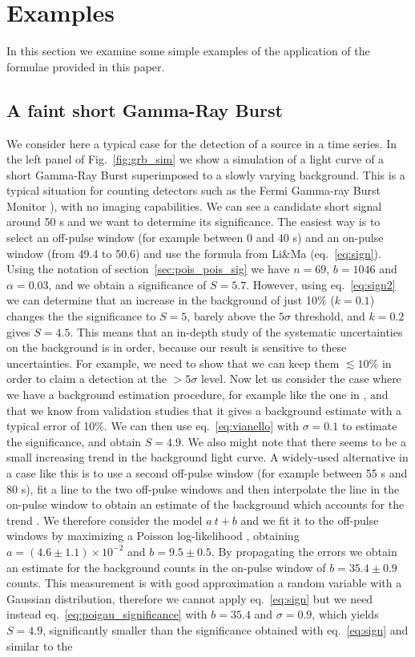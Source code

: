 \documentclass[twocolumn]{aastex61}
\begin{document}
\section{Examples}
\label{sec:examples}
In this section we examine some simple examples of the application of the formulae provided in this paper.

\subsection{A faint short Gamma-Ray Burst}

We consider here a typical case for the detection of a source in a time series. In the left panel of Fig.~\ref{fig:grb_sim} we show a simulation of a light curve of a short Gamma-Ray Burst superimposed to a slowly varying background. This is a typical situation for counting detectors such as the Fermi Gamma-ray Burst Monitor \citep{theGBM}), with no imaging capabilities. We can see a candidate short signal around 50 s and we want to determine its significance. The easiest way is to select an off-pulse window (for example between 0 and 40 s) and an on-pulse window (from 49.4 to 50.6) and use the formula from Li\&Ma (eq.~\ref{eq:sign}). Using the notation of section~\ref{sec:pois_pois_sig} we have $n=69$, $b=1046$ and $\alpha = 0.03$, and we obtain a significance of $S = 5.7$. However, using eq.~\ref{eq:sign2} we can determine that an increase in the background of just 10\% ($k = 0.1$) changes the the significance to $S = 5$, barely above the $5\sigma$ threshold, and $k=0.2$ gives $S=4.5$. This means that an in-depth study of the systematic uncertainties on the background is in order, because our result is sensitive to these uncertainties. For example, we need to show that we can keep them $\lesssim 10$\% in order to claim a detection at the $>5\sigma$ level. Now let us consider the case where we have a background estimation procedure, for example like the one in \citet{Szecsietal2013}, and that we know from validation studies that it gives a background estimate with a typical error of 10\%. We can then use eq.~\ref{eq:vianello} with $\sigma = 0.1$ to estimate the significance, and obtain $S=4.9$. We also might note that there seems to be a small increasing trend in the background light curve. A widely-used alternative in a case like this is to use a second off-pulse window (for example between 55 s and 80 s), fit a line to the two off-pulse windows and then interpolate the line in the on-pulse window to obtain an estimate of the background which accounts for the trend \citep[see for example]{GBMCatalog}. We therefore consider the model $a~t + b$ and we fit it to the off-pulse windows by maximizing a Poisson log-likelihood \citep{Cash}, obtaining $a = (4.6 \pm 1.1) \times 10^{-2}$ and $b = 9.5 \pm 0.5$. By propagating the errors we obtain an estimate for the background counts in the on-pulse window of $b=35.4 \pm 0.9$ counts. This measurement is with good approximation a random variable with a Gaussian distribution, therefore we cannot apply eq.~\ref{eq:sign} but we need instead eq.~\ref{eq:poigau_significance} with $b=35.4$ and $\sigma=0.9$, which yields $S=4.9$, significantly smaller than the significance obtained with eq.~\ref{eq:sign} and similar to the 
\end{document}
